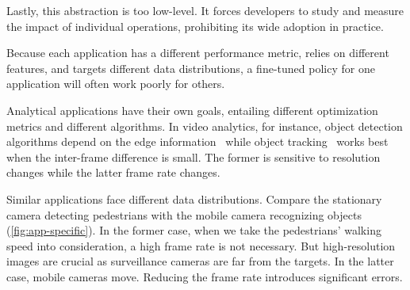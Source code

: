 Lastly, this abstraction is too low-level. It forces developers to study and measure the
impact of individual operations, prohibiting its wide adoption in practice.

 Because each application
has a different performance metric, relies on different features, and targets
different data distributions, a fine-tuned policy for one application will often work
poorly for others.

Analytical applications have their own goals, entailing different optimization metrics and
different algorithms.
%
%
In video analytics, for instance,
object detection algorithms depend on the edge
information~\cite{canny1986computational, lowe2004distinctive, viola2001rapid}
while object tracking~\cite{allen2004object} works best when the inter-frame
difference is small. The former is sensitive to resolution changes while the
latter frame rate changes.

Similar applications face different data distributions. Compare the stationary
camera detecting pedestrians with the mobile camera recognizing objects
(\autoref{fig:app-specific}). In the former case, when we take the pedestrians'
walking speed into consideration, a high frame rate is not necessary. But
high-resolution images are crucial as surveillance cameras are far from the
targets. In the latter case, mobile cameras move. Reducing the frame rate
introduces significant errors.

